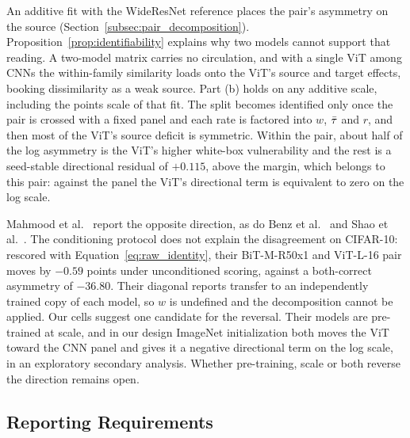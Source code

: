 An additive fit with the WideResNet reference places the pair's asymmetry on the source (Section~\ref{subsec:pair_decomposition}). Proposition~\ref{prop:identifiability} explains why two models cannot support that reading. A two-model matrix carries no circulation, and with a single ViT among CNNs the within-family similarity loads onto the ViT's source and target effects, booking dissimilarity as a weak source. Part (b) holds on any additive scale, including the points scale of that fit. The split becomes identified only once the pair is crossed with a fixed panel and each rate is factored into $w$, $\bar{\tau}$ and $r$, and then most of the ViT's source deficit is symmetric. Within the pair, about half of the log asymmetry is the ViT's higher white-box vulnerability and the rest is a seed-stable directional residual of $+0.115$, above the margin, which belongs to this pair: against the panel the ViT's directional term is equivalent to zero on the log scale.

Mahmood et al.~\cite{mahmood2021robustness} report the opposite direction, as do Benz et al.~\cite{benz2021adversarial} and Shao et al.~\cite{shao2022adversarial}. The conditioning protocol does not explain the disagreement on CIFAR-10: rescored with Equation~\eqref{eq:raw_identity}, their BiT-M-R50x1 and ViT-L-16 pair moves by $-0.59$ points under unconditioned scoring, against a both-correct asymmetry of $-36.80$. Their diagonal reports transfer to an independently trained copy of each model, so $w$ is undefined and the decomposition cannot be applied. Our cells suggest one candidate for the reversal. Their models are pre-trained at scale, and in our design ImageNet initialization both moves the ViT toward the CNN panel and gives it a negative directional term on the log scale, in an exploratory secondary analysis. Whether pre-training, scale or both reverse the direction remains open.

\subsection{Reporting Requirements}
\label{subsec:implications}

